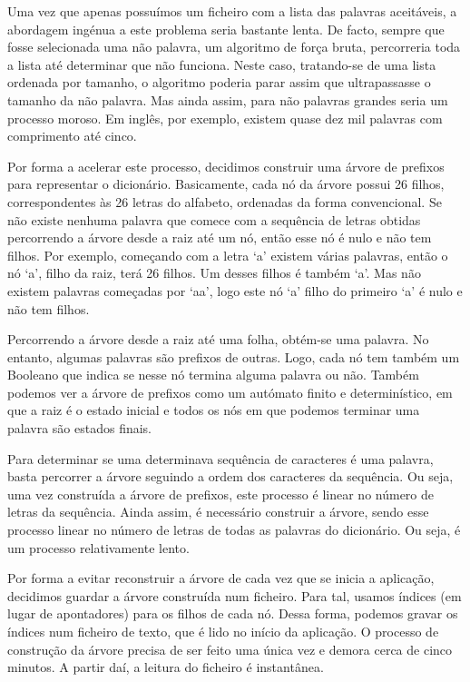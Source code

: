 \documentclass[12pt,a4paper,reqno]{report}
\numberwithin{equation}{section}
\begin{document}
Uma vez que apenas possuímos um ficheiro com a lista das palavras aceitáveis, a abordagem ingénua a este problema seria bastante lenta. De facto, sempre que fosse selecionada uma não palavra, um algoritmo de força bruta, percorreria toda a lista até determinar que não funciona. Neste caso, tratando-se de uma lista ordenada por tamanho, o algoritmo poderia parar assim que ultrapassasse o tamanho da não palavra. Mas ainda assim, para não palavras grandes seria um processo moroso. Em inglês, por exemplo, existem quase dez mil palavras com comprimento até cinco.

Por forma a acelerar este processo, decidimos construir uma árvore de prefixos para representar o dicionário. Basicamente, cada nó da árvore possui 26 filhos, correspondentes às 26 letras do alfabeto, ordenadas da forma convencional. Se não existe nenhuma palavra que comece com a sequência de letras obtidas percorrendo a árvore desde a raiz até um nó, então esse nó é nulo e não tem filhos. Por exemplo, começando com a letra `a' existem várias palavras, então o nó `a', filho da raiz, terá 26 filhos. Um desses filhos é também `a'. Mas não existem palavras começadas por `aa', logo este nó `a' filho do primeiro `a' é nulo e não tem filhos.

Percorrendo a árvore desde a raiz até uma folha, obtém-se uma palavra. No entanto, algumas palavras são prefixos de outras. Logo, cada nó tem também um Booleano que indica se nesse nó termina alguma palavra ou não. Também podemos ver a árvore de prefixos como um autómato finito e determinístico, em que a raiz é o estado inicial e todos os nós em que podemos terminar uma palavra são estados finais.  

Para determinar se uma determinava sequência de caracteres é uma palavra, basta percorrer a árvore seguindo a ordem dos caracteres da sequência. Ou seja, uma vez construída a árvore de prefixos, este processo é linear no número de letras da sequência. Ainda assim, é necessário construir a árvore, sendo esse processo linear no número de letras de todas as palavras do dicionário. Ou seja, é um processo relativamente lento. 

Por forma a evitar reconstruir a árvore de cada vez que se inicia a aplicação, decidimos guardar a árvore construída num ficheiro. Para tal, usamos índices (em lugar de apontadores) para os filhos de cada nó. Dessa forma, podemos gravar os índices num ficheiro de texto, que é lido no início da aplicação. O processo de construção da árvore precisa de ser feito uma única vez e demora cerca de cinco minutos. A partir daí, a leitura do ficheiro é instantânea.
\end{document}
